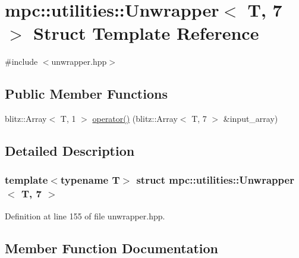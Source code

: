 \hypertarget{structmpc_1_1utilities_1_1_unwrapper_3_01_t_00_017_01_4}{}\section{mpc\+:\+:utilities\+:\+:Unwrapper$<$ T, 7 $>$ Struct Template Reference}
\label{structmpc_1_1utilities_1_1_unwrapper_3_01_t_00_017_01_4}


{\ttfamily \#include $<$unwrapper.\+hpp$>$}

\subsection*{Public Member Functions}
\begin{DoxyCompactItemize}
\item 
blitz\+::\+Array$<$ T, 1 $>$ \mbox{\hyperlink{structmpc_1_1utilities_1_1_unwrapper_3_01_t_00_017_01_4_a470e342ad5dfb0313c9ba0b9503cdfdc}{operator()}} (blitz\+::\+Array$<$ T, 7 $>$ \&input\+\_\+array)
\end{DoxyCompactItemize}


\subsection{Detailed Description}
\subsubsection*{template$<$typename T$>$\newline
struct mpc\+::utilities\+::\+Unwrapper$<$ T, 7 $>$}



Definition at line 155 of file unwrapper.\+hpp.



\subsection{Member Function Documentation}
\mbox{\label{structmpc_1_1utilities_1_1_unwrapper_3_01_t_00_017_01_4_a470e342ad5dfb0313c9ba0b9503cdfdc}} 
